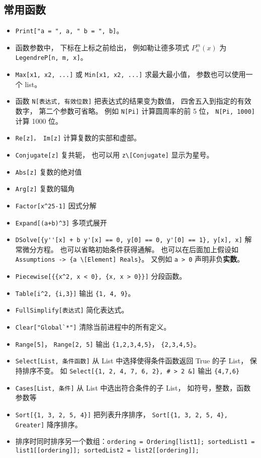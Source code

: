 \subsection{常用函数}
\begin{itemize}
\item \verb|Print["a = ", a, " b = ", b]|。
\item 函数参数中， 下标在上标之前给出， 例如勒让德多项式 $P_n^m(x)$ 为 \verb|LegendreP[n, m, x]|。
\item \verb|Max[x1, x2, ...]| 或 \verb|Min[x1, x2, ...]| 求最大最小值， 参数也可以使用一个 list。
\item 函数 \verb|N[表达式, 有效位数]| 把表达式的结果变为数值， 四舍五入到指定的有效数字， 第二个参数可省略。 例如 \verb|N[Pi]| 计算圆周率的前 5 位， \verb|N[Pi, 1000]| 计算 1000 位。
\item \verb|Re[z]， Im[z]| 计算复数的实部和虚部。
\item \verb|Conjugate[z]| 复共轭， 也可以用 \verb|z\[Conjugate]| 显示为星号。
\item \verb|Abs[z]| 复数的绝对值
\item \verb|Arg[z]| 复数的辐角
\item \verb|Factor[x^25-1]| 因式分解
\item \verb|Expand[(a+b)^3]| 多项式展开
\item \verb|DSolve[{y''[x] + b y'[x] == 0, y[0] == 0, y'[0] == 1}, y[x], x]| 解常微分方程。 也可以省略初始条件获得通解。 也可以在后面加上假设如 \verb|Assumptions -> {a \[Element] Reals}|。 又例如 \verb|a > 0| 声明非负\textbf{实数}。
\item \verb|Piecewise[{{x^2, x < 0}, {x, x > 0}}]| 分段函数。
\item \verb|Table[i^2, {i,3}]| 输出 \verb|{1, 4, 9}|。
\item \verb|FullSimplify[表达式]| 简化表达式。
\item \verb|Clear["Global`*"]| 清除当前进程中的所有定义。
\item \verb|Range[5]|， \verb|Range[2, 5]| 输出 \verb|{1,2,3,4,5}|， \verb|{2,3,4,5}|。
\item \verb|Select[List, 条件函数]| 从 List 中选择使得条件函数返回 True 的子 List， 保持排序不变。 如 \verb|Select[{1, 2, 4, 7, 6, 2}, # > 2 &]| 输出 \verb|{4,7,6}|
\item \verb|Cases[List, 条件]| 从 List 中选出符合条件的子 List， 如符号，整数，函数参数等
\item \verb|Sort[{1, 3, 2, 5, 4}]| 把列表升序排序， \verb|Sort[{1, 3, 2, 5, 4}, Greater]| 降序排序。
\item 排序时同时排序另一个数组：\verb|ordering = Ordering[list1]; sortedList1 = list1[[ordering]]; sortedList2 = list2[[ordering]];|

\end{itemize}
